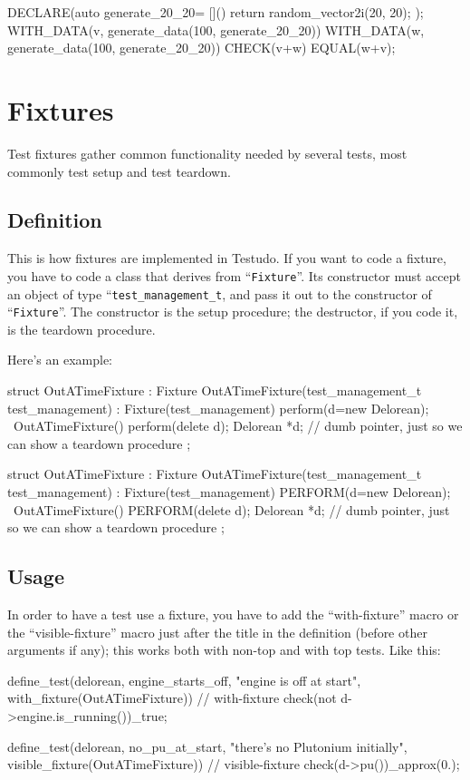 \documentclass[twoside, a4paper, article]{memoir}
\begin{document}
\begin{cpplisting}
DECLARE(auto generate_20_20=
        []() { return random_vector2i(20, 20); });
WITH_DATA(v, generate_data(100, generate_20_20))
  WITH_DATA(w, generate_data(100, generate_20_20))
    CHECK(v+w) EQUAL(w+v);
\end{cpplisting}


\chapter{Fixtures}
\label{cha:fixtures}

Test fixtures gather common functionality needed by several tests, most
commonly test setup and test teardown.

\section{Definition}
\label{sec:fixture-definition}

This is how fixtures are implemented in Testudo.  If you want to code a
fixture, you have to code a class that derives from
``\texttt{Fixture}''.  Its constructor must accept an object of type
``\texttt{test\_management\_t}, and pass it out to the constructor of
``\texttt{Fixture}''.  The constructor is the setup procedure; the
destructor, if you code it, is the teardown procedure.

Here's an example:
\begin{cpplisting}
struct OutATimeFixture : Fixture {
  OutATimeFixture(test_management_t test_management)
    : Fixture(test_management)
    { perform(d=new Delorean); }
  ~OutATimeFixture()
    { perform(delete d); }
  Delorean *d; // dumb pointer, just so we can show a teardown procedure
};
\end{cpplisting}

\begin{cpplisting}
struct OutATimeFixture : Fixture
{
  OutATimeFixture(test_management_t test_management)
    : Fixture(test_management)
  {
    PERFORM(d=new Delorean);
  }
  ~OutATimeFixture()
  {
    PERFORM(delete d);
  }
  Delorean *d; // dumb pointer, just so we can show a teardown procedure
};
\end{cpplisting}

\section{Usage}
\label{sec:fixture-usage}

In order to have a test use a fixture, you have to add the ``with-fixture''
macro or the ``visible-fixture'' macro just after the title in the definition
(before other arguments if any); this works both with non-top and with top
tests.  Like this:
\begin{cpplisting}
define_test(delorean,
            engine_starts_off, "engine is off at start",
            with_fixture(OutATimeFixture)) // with-fixture
{
  check(not d->engine.is_running())_true;
}

define_test(delorean,
            no_pu_at_start, "there's no Plutonium initially",
            visible_fixture(OutATimeFixture)) // visible-fixture
{
  check(d->pu())_approx(0.);
}
\end{cpplisting}
\end{document}
